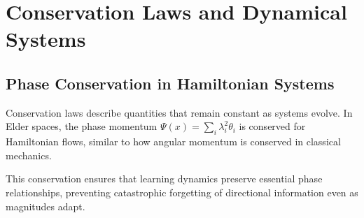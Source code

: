 
\chapter{Conservation Laws and Dynamical Systems}

\section{Phase Conservation in Hamiltonian Systems}

\begin{intuition}
Conservation laws describe quantities that remain constant as systems evolve. In Elder spaces, the phase momentum $\Psi(x) = \sum_i \lambda_i^2 \theta_i$ is conserved for Hamiltonian flows, similar to how angular momentum is conserved in classical mechanics.

This conservation ensures that learning dynamics preserve essential phase relationships, preventing catastrophic forgetting of directional information even as magnitudes adapt.
\end{intuition}

